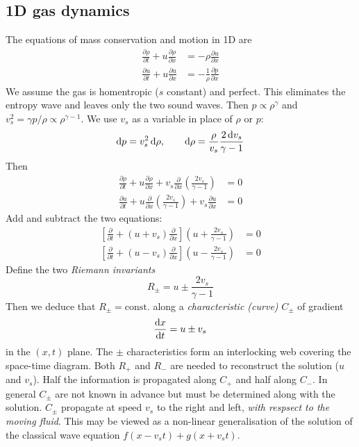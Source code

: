 \documentclass{jknotes}
\begin{document}
\subsection{1D gas dynamics}
The equations of mass conservation and motion in 1D are
\begin{align}
	\frac{\partial \rho}{\partial t} + u \frac{\partial \rho}{\partial x} &= -
\rho \frac{\partial u}{\partial x}\\
	\frac{\partial u}{\partial t} + u \frac{\partial u}{\partial x} &= -
	\frac{1}{\rho}\frac{\partial p}{\partial x}
\end{align}
We assume the gas is homentropic ($s$ constant) and perfect. This eliminates
the entropy wave and leaves only the two sound waves. Then $p \propto
\rho^\gamma$ and $v_s^2 = \gamma p/\rho \propto \rho^{\gamma -1}$. We use
$v_s$ as a variable in place of $\rho$ or $p$:
\begin{equation}
	\diffd p = v_s^2\, \diffd \rho, \hspace{2em} \diffd \rho = \frac{\rho}{v_s}
	\frac{2 \,\diffd v_s}{\gamma -1}
\end{equation}
Then
\begin{align}
	\frac{\partial \rho}{\partial t} + u \frac{\partial \rho}{\partial x} +
	v_s \frac{\partial}{\partial x} \left( \frac{2v_s}{\gamma -1}\right)
	&= 0 \\
	\frac{\partial u}{\partial t} + u \frac{\partial}{\partial x}\left(\frac{2
v_s}{\gamma-1}\right) + v_s \frac{\partial u}{\partial x}&= 0
\end{align}
Add and subtract the two equations:
\begin{align}
	\left[ \frac{\partial}{\partial t} + (u+v_s)\frac{\partial}{\partial x}
	\right] \left( u + \frac{ 2 v_s}{\gamma -1}\right) &= 0 \\
	\left[ \frac{\partial}{\partial t} + (u-v_s)\frac{\partial}{\partial x}
	\right] \left( u - \frac{ 2 v_s}{\gamma -1}\right) &= 0 
\end{align}
Define the two \emph{Riemann invariants}
\begin{equation}
	R_\pm = u \pm \frac{2 v_s}{\gamma -1}
\end{equation}
Then we deduce that $R_\pm = \text{const.}$ along a \emph{characteristic
(curve)} $C_\pm$ of gradient
\begin{equation}
	\frac{\diffd x}{\diffd t} = u \pm v_s
\end{equation}
in the $(x,t)$ plane. The $\pm$ characteristics form an interlocking web
covering the space-time diagram. Both $R_+$ and $R_-$ are needed to
reconstruct the solution ($u$ and $v_s$). Half the information is propagated
along $C_+$ and half along $C_-$. In general $C_\pm$ are not known in advance
but must be determined along with the solution. $C_\pm$ propagate at speed
$v_s$ to the right and left, \emph{with respsect to the moving fluid}. This
may be viewed as a non-linear generalisation of the solution of the
classical wave equation $f(x-v_st) + g(x+v_s t)$.
\end{document}
